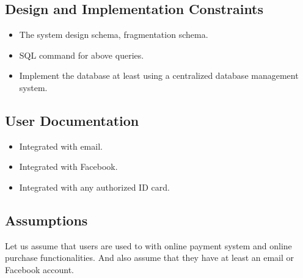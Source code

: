 \subsection{Design and Implementation Constraints}
\begin{itemize}
\item The system design schema, fragmentation schema.
\item SQL command for above queries.
\item Implement the database at least using a centralized database management system.
\end{itemize}
\subsection{User Documentation}
\begin{itemize}
\item Integrated with email.
\item Integrated with Facebook.
\item Integrated with any authorized ID card.
\end{itemize}
\subsection{Assumptions}
Let us assume that users are used to with online payment system and online purchase functionalities. And also assume that they have at least an email or Facebook account.

